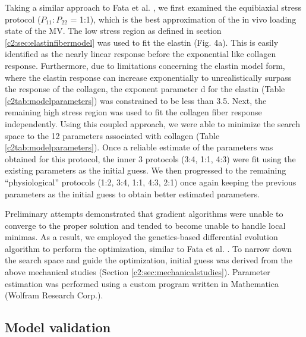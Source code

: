     Taking a similar approach to Fata et al. \cite{fata_insights_2014}, we first examined the equibiaxial stress protocol ($P_{11}:P_{22}$ = 1:1), which is the best approximation of the in vivo loading state of the MV. The low stress region as defined in section \ref{c2:sec:elastinfibermodel} was used to fit the elastin (Fig. 4a). This is easily identified as the nearly linear response before the exponential like collagen response. Furthermore, due to limitations concerning the elastin model form, where the elastin response can increase exponentially to unrealistically surpass the response of the collagen, the exponent parameter d for the elastin (Table \ref{c2tab:modelparameters}) was constrained to be less than 3.5. Next, the remaining high stress region was used to fit the collagen fiber response independently. Using this coupled approach, we were able to minimize the search space to the 12 parameters associated with collagen (Table \ref{c2tab:modelparameters}). Once a reliable estimate of the parameters was obtained for this protocol, the inner 3 protocols (3:4, 1:1, 4:3) were fit using the existing parameters as the initial guess. We then progressed to the remaining “physiological” protocols (1:2, 3:4, 1:1, 4:3, 2:1) once again keeping the previous parameters as the initial guess to obtain better estimated parameters.
    
    
    Preliminary attempts demonstrated that gradient algorithms were unable to converge to the proper solution and tended to become unable to handle local minimas. As a result, we employed the genetics-based differential evolution algorithm to perform the optimization, similar to Fata et al. \cite{fata_insights_2014}. To narrow down the search space and guide the optimization, initial guess was derived from the above mechanical studies (Section \ref{c2:sec:mechanicalstudies}). Parameter estimation was performed using a custom program written in Mathematica (Wolfram Research Corp.).
    




\subsection{Model validation} \label{c2:sec:26}

